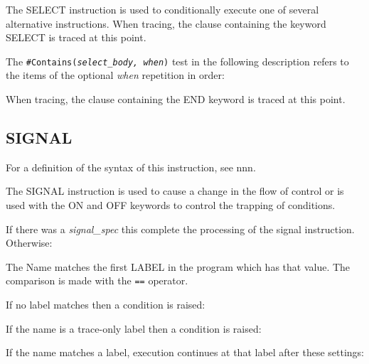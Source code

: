 The SELECT instruction is used to conditionally execute one of several
alternative instructions. When tracing, the clause containing the
keyword SELECT is traced at this point.

The \texttt{\#Contains(}\emph{\texttt{select\_body,\ when}}\texttt{)}
test in the following description refers to the items of the optional
\emph{when} repetition in order:



When tracing, the clause containing the END keyword is traced at this
point.

\subsection{SIGNAL}\label{signal}

For a definition of the syntax of this instruction, see nnn.

The SIGNAL instruction is used to cause a change in the flow of control
or is used with the ON and OFF keywords to control the trapping of
conditions.



If there was a \emph{signal\_spec} this complete the processing of the
signal instruction. Otherwise:



The Name matches the first LABEL in the program which has that value.
The comparison is made with the
\texttt{\textquotesingle{}==\textquotesingle{}} operator.

If no label matches then a condition is raised:



If the name is a trace-only label then a condition is raised:



If the name matches a label, execution continues at that label after
these settings:



